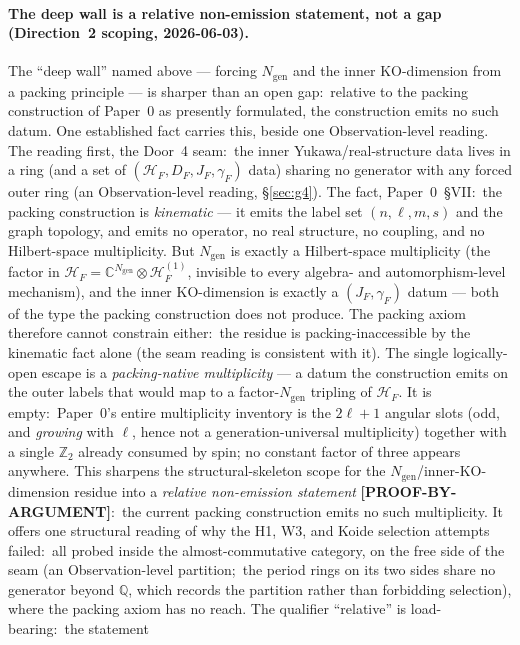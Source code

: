 \documentclass[11pt]{article}
\begin{document}
\paragraph{The deep wall is a relative non-emission statement, not a gap
  (Direction~2 scoping, 2026-06-03).} The ``deep wall'' named above --- forcing
$N_{\mathrm{gen}}$ and the inner KO-dimension from a packing principle ---
is sharper than an open gap:\ relative to the packing construction of
Paper~0 as presently formulated, the construction emits no such datum. One
established fact carries this, beside one Observation-level reading. The
reading first, the Door~4 seam:\ the inner
Yukawa/real-structure data lives in a ring (and a set of
$(\mathcal{H}_F, D_F, J_F, \gamma_F)$ data) sharing no generator with
any forced outer ring (an Observation-level reading, \S\ref{sec:g4}). The fact, Paper~0~\S VII:\ the packing construction is
\emph{kinematic} --- it emits the label set $(n, \ell, m, s)$ and the
graph topology, and emits no operator, no real structure, no coupling,
and no Hilbert-space multiplicity. But $N_{\mathrm{gen}}$ is exactly a
Hilbert-space multiplicity (the factor in $\mathcal{H}_F =
\mathbb{C}^{N_{\mathrm{gen}}} \otimes \mathcal{H}_F^{(1)}$, invisible to
every algebra- and automorphism-level mechanism), and the inner
KO-dimension is exactly a $(J_F, \gamma_F)$ datum --- both of the type
the packing construction does not produce. The packing axiom therefore
cannot constrain either:\ the residue is packing-inaccessible by the
kinematic fact alone (the seam reading is consistent with it). The single logically-open escape is a
\emph{packing-native multiplicity} --- a datum the construction emits on
the outer labels that would map to a factor-$N_{\mathrm{gen}}$ tripling
of $\mathcal{H}_F$. It is empty:\ Paper~0's entire multiplicity inventory
is the $2\ell+1$ angular slots (odd, and \emph{growing} with $\ell$,
hence not a generation-universal multiplicity) together with a single
$\mathbb{Z}_2$ already consumed by spin; no constant factor of three
appears anywhere. This sharpens the structural-skeleton scope for the
$N_{\mathrm{gen}}$/inner-KO-dimension residue into a \emph{relative
non-emission statement} \textbf{[PROOF-BY-ARGUMENT]}:\ the current
packing construction emits no such multiplicity. It offers one
structural reading of why the H1, W3, and Koide selection attempts
failed:\ all probed inside the almost-commutative category, on the free
side of the seam (an Observation-level partition;\ the period rings on
its two sides share no generator beyond $\mathbb{Q}$, which records the
partition rather than forbidding selection), where the packing axiom has no reach. The qualifier ``relative'' is load-bearing:\ the statement
\end{document}
